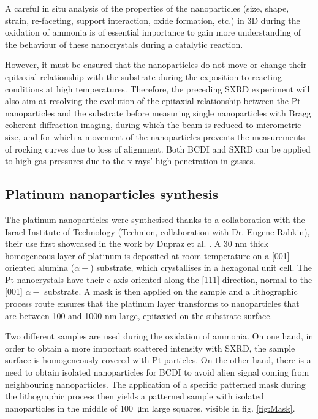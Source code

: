 A careful in situ analysis of the properties of the nanoparticles (size, shape, strain, re-faceting, support interaction, oxide formation, etc.) in 3D during the oxidation of ammonia is of essential importance to gain more understanding of the behaviour of these nanocrystals during a catalytic reaction.

However, it must be ensured that the nanoparticles do not move or change their epitaxial relationship with the substrate during the exposition to reacting conditions at high temperatures.
Therefore, the preceding SXRD experiment will also aim at resolving the evolution of the epitaxial relationship between the Pt nanoparticles and the  substrate before measuring single nanoparticles with Bragg coherent diffraction imaging, during which the beam is reduced to micrometric size, and for which a movement of the nanoparticles prevents the measurements of rocking curves due to loss of alignment.
Both BCDI and SXRD can be applied to high gas pressures due to the x-rays’ high penetration in gasses.

\subsection{Platinum nanoparticles synthesis}\label{sec:PtParticles}

The platinum nanoparticles were synthesised thanks to a collaboration with the Israel Institute of Technology (Technion, collaboration with Dr. Eugene Rabkin), their use first showcased in the work by Dupraz et al. \parencite*{Dupraz2017}.
A 30 nm thick homogeneous layer of platinum is deposited at room temperature on a [001] oriented alumina ($\alpha-$) substrate, which crystallises in a hexagonal unit cell.
The Pt nanocrystals have their c-axis oriented along the [111] direction, normal to the [001] $\alpha-$ substrate.
A mask is then applied on the sample and a lithographic process route ensures that the platinum layer transforms to nanoparticles that are between 100 and 1000 nm large, epitaxied on the substrate surface.

Two different samples are used during the oxidation of ammonia.
On one hand, in order to obtain a more important scattered intensity with SXRD, the sample surface is homogeneously covered with Pt particles.
On the other hand, there is a need to obtain isolated nanoparticles for BCDI to avoid alien signal coming from neighbouring nanoparticles.
The application of a specific patterned mask during the lithographic process then yields a patterned sample with isolated nanoparticles in the middle of \qty{100}{\um} large squares, visible in fig. \ref{fig:Mask}.

